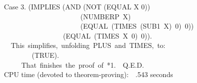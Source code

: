\documentclass[10pt]{book}
\newenvironment{pubasis}{\begin{flushleft}}{\end{flushleft}}
\begin{document}
\begin{pubasis}
Case 3.	(IMPLIES (AND (NOT (EQUAL X 0))\\
~~~~~~~~~~~~~~~~~~~~~~(NUMBERP~X)\\
~~~~~~~~~~~~~~~~~~~~~~(EQUAL~(TIMES~(SUB1~X)~0)~0))\\
~~~~~~~~~~~~~~~~~(EQUAL~(TIMES~X~0)~0)).\\

~~This~simplifies,~unfolding~PLUS~and~TIMES,~to:\\

~~~~~~~~(TRUE).\\

~~~~~That~finishes~the~proof~of~*1.~~Q.E.D.\\

CPU time (devoted to theorem-proving):~~.543 seconds\\
\end{pubasis}
\end{document}
